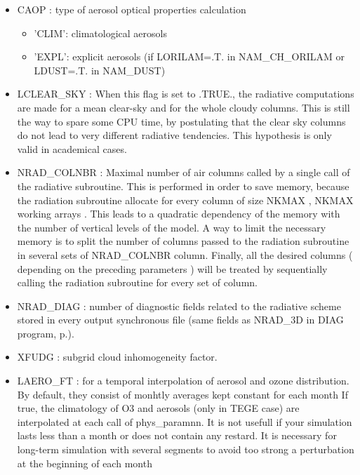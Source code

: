 \begin{itemize}
\item
{}
CAOP :  type of aerosol optical properties calculation
\begin{itemize}
\item 'CLIM': climatological aerosols
\item 'EXPL': explicit aerosols (if LORILAM=.T. in NAM\_CH\_ORILAM or LDUST=.T. in NAM\_DUST)
\end{itemize}

\item
{}
LCLEAR\_SKY : When this flag is set  to .TRUE., the 
 radiative computations are made for a mean clear-sky and for the whole 
 cloudy columns. This is still the way to spare some CPU time, by postulating
that the clear sky columns do not lead to very different radiative tendencies.
This hypothesis is only valid in academical cases.

\item
{}
NRAD\_COLNBR : Maximal number of air columns called by a single call
of the radiative subroutine. This is performed in order to save
memory, because the radiation subroutine allocate for every column of
size NKMAX , NKMAX working arrays . This leads to a quadratic
dependency of the memory with the number of vertical levels of the
model. A way to limit the necessary memory is to split the number of
columns passed to the radiation subroutine in several sets of
NRAD\_COLNBR column. Finally, all the desired columns ( depending on
the preceding parameters ) will be treated  by sequentially calling
the radiation subroutine for every set of column.

\item
{}
NRAD\_DIAG : number of diagnostic fields related to the
radiative scheme stored in every output synchronous file (same fields as
 NRAD\_3D in DIAG program, p.\pageref{nrad3d}).

\item
{}
XFUDG : subgrid cloud inhomogeneity factor.

\item
{}
LAERO\_FT : for a temporal interpolation of aerosol and ozone distribution. 
                                                By default, they consist of monhtly averages kept constant for each month 
                                                If true, the climatology of O3 and aerosols (only in TEGE case) are interpolated at each 
                                                call of phys\_paramnn. 
                                                It is not usefull if your simulation lasts less than a month or does not contain any restard. 
                                                It is necessary for long-term simulation with several segments to avoid too strong  a perturbation at the 
                                                beginning of each month



\end{itemize}
